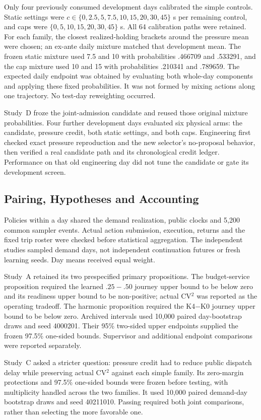 Only four previously consumed development days calibrated the simple controls. Static settings were $c\in\{0,2.5,5,7.5,10,15,20,30,45\}$ s per remaining control, and caps were $\{0,5,10,15,20,30,45\}$ s. All 64 calibration paths were retained. For each family, the closest realized-holding brackets around the pressure mean were chosen; an ex-ante daily mixture matched that development mean. The frozen static mixture used 7.5 and 10 with probabilities .466709 and .533291, and the cap mixture used 10 and 15 with probabilities .210341 and .789659. The expected daily endpoint was obtained by evaluating both whole-day components and applying these fixed probabilities. It was not formed by mixing actions along one trajectory. No test-day reweighting occurred.

Study~D froze the joint-admission candidate and reused those original mixture probabilities. Four further development days evaluated six physical arms: the candidate, pressure credit, both static settings, and both caps. Engineering first checked exact pressure reproduction and the new selector's no-proposal behavior, then verified a real candidate path and its chronological credit ledger. Performance on that old engineering day did not tune the candidate or gate its development screen.

\subsection{Pairing, Hypotheses and Accounting}
Policies within a day shared the demand realization, public clocks and 5,200 common sampler events. Actual action submission, execution, returns and the fixed trip roster were checked before statistical aggregation. The independent studies sampled demand days, not independent continuation futures or fresh learning seeds. Day means received equal weight.

Study~A retained its two prespecified primary propositions. The budget-service proposition required the learned $.25-.50$ journey upper bound to be below zero and its readiness upper bound to be non-positive; actual CV$^2$ was reported as the operating tradeoff. The harmonic proposition required the K4$-$K0 journey upper bound to be below zero. Archived intervals used 10,000 paired day-bootstrap draws and seed 4000201. Their 95\% two-sided upper endpoints supplied the frozen 97.5\% one-sided bounds. Supervisor and additional endpoint comparisons were reported separately.

Study~C asked a stricter question: pressure credit had to reduce public dispatch delay while preserving actual CV$^2$ against each simple family. Its zero-margin protections and 97.5\% one-sided bounds were frozen before testing, with multiplicity handled across the two families. It used 10,000 paired demand-day bootstrap draws and seed 40211010. Passing required both joint comparisons, rather than selecting the more favorable one.

